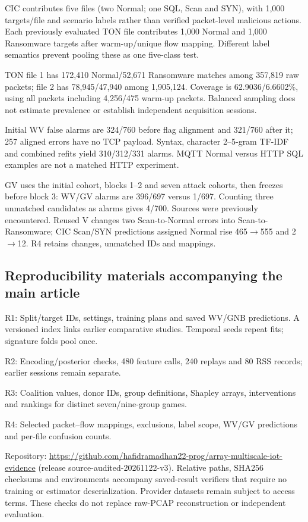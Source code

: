 \documentclass[10pt,a4paper]{article}
\begin{document}
CIC contributes five files (two Normal; one SQL, Scan and SYN), with 1,000 targets/file and scenario labels rather than verified packet-level malicious actions. Each previously evaluated TON file contributes 1,000 Normal and 1,000 Ransomware targets after warm-up/unique flow mapping. Different label semantics prevent pooling these as one five-class test.

TON file 1 has 172,410 Normal/52,671 Ransomware matches among 357,819 raw packets; file 2 has 78,945/47,940 among 1,905,124. Coverage is 62.9036/6.6602\%, using all packets including 4,256/475 warm-up packets. Balanced sampling does not estimate prevalence or establish independent acquisition sessions.

Initial WV false alarms are 324/760 before flag alignment and 321/760 after it; 257 aligned errors have no TCP payload. Syntax, character 2--5-gram TF-IDF and combined refits yield 310/312/331 alarms. MQTT Normal versus HTTP SQL examples are not a matched HTTP experiment.

GV uses the initial cohort, blocks 1--2 and seven attack cohorts, then freezes before block 3: WV/GV alarms are 396/697 versus 1/697. Counting three unmatched candidates as alarms gives 4/700. Sources were previously encountered. Reused V changes two Scan-to-Normal errors into Scan-to-Ransomware; CIC Scan/SYN predictions assigned Normal rise 465\(\rightarrow\)555 and 2\(\rightarrow\)12. R4 retains changes, unmatched IDs and mappings.

\subsection*{Reproducibility materials accompanying the main article}

R1: Split/target IDs, settings, training plans and saved WV/GNB predictions. A versioned index links earlier comparative studies. Temporal seeds repeat fits; signature folds pool once.

R2: Encoding/posterior checks, 480 feature calls, 240 replays and 80 RSS records; earlier sessions remain separate.

R3: Coalition values, donor IDs, group definitions, Shapley arrays, interventions and rankings for distinct seven/nine-group games.

R4: Selected packet--flow mappings, exclusions, label scope, WV/GV predictions and per-file confusion counts.

Repository: \url{https://github.com/hafidramadhan22-prog/array-multiscale-iot-evidence} (release source-audited-20261122-v3). Relative paths, SHA256 checksums and environments accompany saved-result verifiers that require no training or estimator deserialization. Provider datasets remain subject to access terms. These checks do not replace raw-PCAP reconstruction or independent evaluation.
\end{document}

